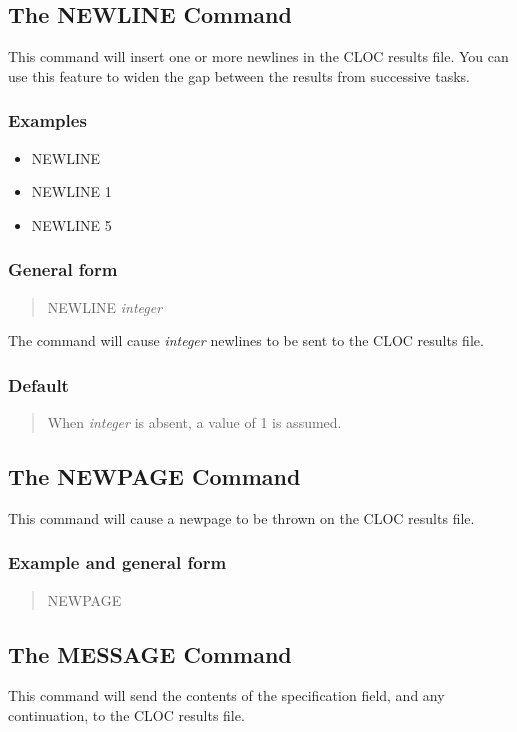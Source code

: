 \subsection{The NEWLINE Command}
This command will insert one or more newlines in the CLOC results file.
You can use this feature to widen the gap between the results from
successive tasks.

\subsubsection{Examples}
\begin{itemize}
\item NEWLINE
\item NEWLINE        1
\item NEWLINE        5
\end{itemize}

\subsubsection{General form}
\begin{quote}
NEWLINE        {\em integer}
\end{quote}
The command will cause {\em integer} newlines to be sent to the CLOC
results file.

\subsubsection{Default}
\begin{quote}
When {\em integer} is absent, a value of 1 is assumed.
\end{quote}

\subsection{The NEWPAGE Command}
This command will cause a newpage to be thrown on the CLOC results file.
\subsubsection{Example and general form}
\begin{quote}
NEWPAGE
\end{quote}

\subsection{The MESSAGE Command}
This command will send the contents of the specification field, and any
continuation, to the CLOC results file.
